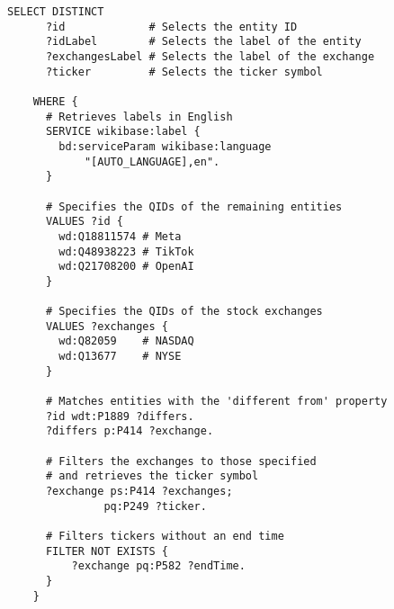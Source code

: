 \begin{lstlisting}[language=SPARQL, caption={SPARQL Query 3: Retrieve entity information for remaining entities with the \textit{different from} property.}, label={lst:sparql_query_3}]
	SELECT DISTINCT 
	  ?id             # Selects the entity ID
	  ?idLabel        # Selects the label of the entity
	  ?exchangesLabel # Selects the label of the exchange
	  ?ticker         # Selects the ticker symbol
	  
	WHERE {
	  # Retrieves labels in English
	  SERVICE wikibase:label {
		bd:serviceParam wikibase:language 
			"[AUTO_LANGUAGE],en".
	  }
	
	  # Specifies the QIDs of the remaining entities
	  VALUES ?id { 
		wd:Q18811574 # Meta
		wd:Q48938223 # TikTok
		wd:Q21708200 # OpenAI
	  }
	
	  # Specifies the QIDs of the stock exchanges
	  VALUES ?exchanges { 
		wd:Q82059    # NASDAQ
		wd:Q13677    # NYSE
	  }
	
	  # Matches entities with the 'different from' property
	  ?id wdt:P1889 ?differs.
	  ?differs p:P414 ?exchange.
	
	  # Filters the exchanges to those specified 
	  # and retrieves the ticker symbol
	  ?exchange ps:P414 ?exchanges; 
			   pq:P249 ?ticker.
			   
	  # Filters tickers without an end time
	  FILTER NOT EXISTS {
		  ?exchange pq:P582 ?endTime.
	  }
	}
  \end{lstlisting}


